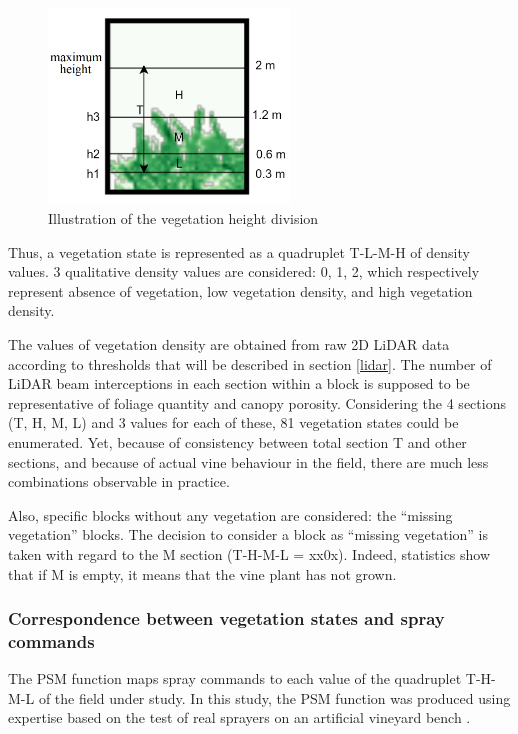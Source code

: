 \documentclass[preprint,3p,times,twocolumn]{elsarticle}
\begin{document}
\begin{figure}[h]
	\begin{center}
		\includegraphics[width=6.4cm]{HautVeg.png}
		\caption{Illustration of the vegetation height division} 
		\label{fig:HautVegetation}
	\end{center}
\end{figure}

Thus, a vegetation state is represented as a quadruplet T-L-M-H of density values. 3 qualitative density values are considered: 0, 1, 2, which respectively represent absence of vegetation, low vegetation density, and high vegetation density. 

The values of vegetation density are obtained from raw 2D LiDAR data according to thresholds that will be described in section \ref{lidar}. The number of LiDAR beam interceptions in each section within a block is supposed to be representative of foliage quantity and canopy porosity.
Considering the 4 sections (T, H, M, L) and 3 values for each of these, 81 vegetation states could be enumerated. Yet, because of consistency between total section T and other sections, and because of actual vine behaviour in the field, there are much less combinations observable in practice.

Also, specific blocks without any vegetation are considered: the “missing vegetation” blocks. The decision to consider a block as “missing vegetation” is taken with regard to the M section (T-H-M-L = xx0x). Indeed, statistics show that if M is empty, it means that the vine plant has not grown. 
\subsubsection{Correspondence between vegetation states and spray commands}

The PSM function maps spray commands to each value of the quadruplet T-H-M-L of the field under study. In this study, the PSM function was produced using expertise based on the test of real sprayers on an artificial vineyard bench \cite{naud2014comparative}.
\end{document}
